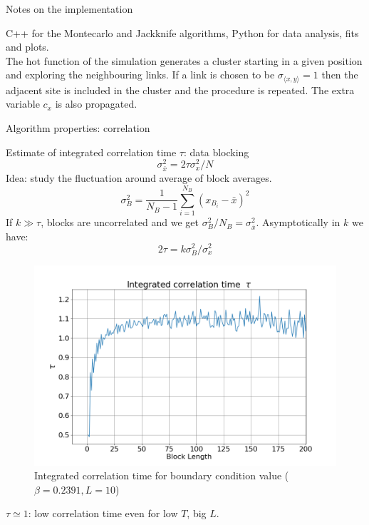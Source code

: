 \documentclass[12pt,handout]{beamer}
\begin{document}
\begin{frame}{Notes on the implementation}
\begin{center}

C++ for the Montecarlo and Jackknife algorithms, Python for data analysis, fits and plots.\\
\vspace{20pt}
The hot function of the simulation generates a cluster starting in a given position and exploring the neighbouring links. If a link is chosen to be $\sigma_{\langle x, y \rangle} = 1$ then the adjacent site is included in the cluster and the procedure is repeated. The extra variable $c_x$ is also propagated.
\end{center}
\end{frame}

\begin{frame}{Algorithm properties: correlation}
\begin{center}
Estimate of integrated correlation time $\tau$: data blocking
\[
\sigma_{\bar{x}}^2 = 2\tau\sigma_{x}^2/N
\]
Idea: study the fluctuation around average of block averages.
\[
\sigma _B ^2 = \frac{1}{N_B - 1}\sum_ {i = 1} ^{N_B} \left( x_{B_i} - \bar{x} \right)^2 
\]
If $k\gg\tau$, blocks are uncorrelated and we get $\sigma_B^2/N_B = \sigma_{\bar{x}}^2$.
Asymptotically in $k$ we have:
\[
2\tau = k \sigma_B ^2/\sigma_{x}^2
\]
\end{center}
\end{frame}


\begin{frame}
\begin{center}
\begin{figure}
\centering
\includegraphics[scale=0.35]{correlation.png}
\caption{Integrated correlation time for boundary condition value ($\beta = 0.2391, L = 10$)\label{fig:corr}}
\end{figure}
$\tau \simeq 1$: low correlation time even for low $T$, big $L$.
\end{center}
\end{frame}
\end{document}
